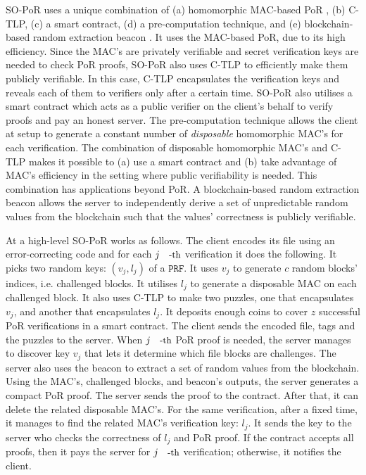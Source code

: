 SO-PoR uses a unique combination of (a) homomorphic MAC-based PoR \cite{DBLP:conf/asiacrypt/ShachamW08}, (b) C-TLP,  (c) a smart contract,  (d) a pre-computation technique, and (e) blockchain-based random extraction beacon \cite{DBLP:journals/iacr/AbadiCKZ19,armknecht2014outsourced}. It uses the MAC-based PoR, due to its high efficiency. Since the MAC's are privately verifiable and secret verification keys are needed to check PoR proofs, SO-PoR also uses C-TLP to efficiently make them publicly verifiable. In this case, C-TLP encapsulates the verification keys and reveals each of them to verifiers only after a certain time. SO-PoR also utilises a smart contract which acts as a public verifier on the client's behalf to verify proofs and pay an honest server. The pre-computation technique allows the client at setup to generate a constant number of \emph{disposable} homomorphic MAC's for each verification.  The combination of disposable homomorphic MAC's and C-TLP  makes it possible to (a) use a smart contract  and (b) take advantage of MAC's efficiency in the setting where public verifiability is needed. This combination has applications beyond PoR.  A blockchain-based random extraction beacon allows the server to independently  derive a set of unpredictable random values from the blockchain such that the values' correctness is publicly verifiable. 



At a high-level  SO-PoR works as follows. The client encodes its file using an error-correcting code and  for each $j\text{\small{-th}}$ verification it does the following. It picks two   random keys: $(v_{\scriptscriptstyle j},l_{\scriptscriptstyle j})$ of a $\mathtt{PRF}$. It uses $v_{\scriptscriptstyle j}$ to generate $c$ random blocks' indices, i.e. challenged blocks. It utilises  $l_{\scriptscriptstyle j}$ to generate a disposable MAC on each challenged block. It also uses C-TLP to make two puzzles, one that encapsulates $v_{\scriptscriptstyle j}$, and  another that encapsulates $l_{\scriptscriptstyle j}$. It deposits enough coins to cover $z$ successful PoR verifications in a smart contract. The client sends the encoded file, tags and the puzzles to the server. When $j\text{\small{-th}}$ PoR proof is needed, the server manages to discover key $v_{\scriptscriptstyle j}$ that lets it determine which file blocks are challenges. The server also uses the beacon to extract a set of random values from the blockchain. Using the MAC's,  challenged blocks, and  beacon's outputs, the server generates a compact PoR proof. The server sends the proof to the contract. After that, it can delete the related disposable MAC's.  For the same verification, after a fixed time, it manages to find the related MAC's verification key: $l_{\scriptscriptstyle j}$. It sends the key to the server who checks the correctness of $l_{\scriptscriptstyle j}$ and  PoR proof. If the contract accepts all proofs, then it pays the server  for $j\text{\small{-th}}$ verification; otherwise, it notifies the client.  







